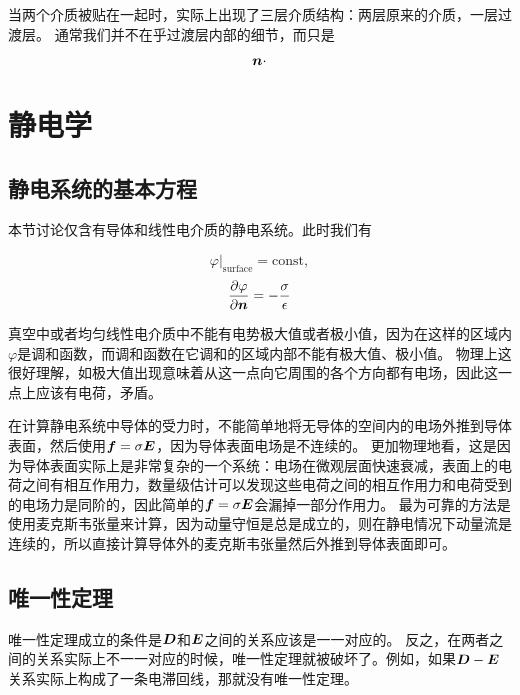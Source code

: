 \documentclass[UTF8, a4paper]{ctexart}
\newcommand*{\const}{\mathrm{const}}
\begin{document}
当两个介质被贴在一起时，实际上出现了三层介质结构：两层原来的介质，一层过渡层。
通常我们并不在乎过渡层内部的细节，而只是

\begin{equation}
    \vb*{n} \cdot 
\end{equation}

\section{静电学}

\subsection{静电系统的基本方程}

本节讨论仅含有导体和线性电介质的静电系统。此时我们有

\begin{equation}
    \varphi|_\text{surface} = \const,
\end{equation}
\begin{equation}
    \pdv{\varphi}{\vb*{n}} = - \frac{\sigma}{\epsilon}
\end{equation}

真空中或者均匀线性电介质中不能有电势极大值或者极小值，因为在这样的区域内$\varphi$是调和函数，而调和函数在它调和的区域内部不能有极大值、极小值。
物理上这很好理解，如极大值出现意味着从这一点向它周围的各个方向都有电场，因此这一点上应该有电荷，矛盾。

在计算静电系统中导体的受力时，不能简单地将无导体的空间内的电场外推到导体表面，然后使用$\vb*{f}=\sigma\vb*{E}$，因为导体表面电场是不连续的。
更加物理地看，这是因为导体表面实际上是非常复杂的一个系统：电场在微观层面快速衰减，表面上的电荷之间有相互作用力，数量级估计可以发现这些电荷之间的相互作用力和电荷受到的电场力是同阶的，因此简单的$\vb*{f}=\sigma\vb*{E}$会漏掉一部分作用力。
最为可靠的方法是使用麦克斯韦张量来计算，因为动量守恒是总是成立的，则在静电情况下动量流是连续的，所以直接计算导体外的麦克斯韦张量然后外推到导体表面即可。

\subsection{唯一性定理}

唯一性定理成立的条件是$\vb*{D}$和$\vb*{E}$之间的关系应该是一一对应的。
反之，在两者之间的关系实际上不一一对应的时候，唯一性定理就被破坏了。例如，如果$\vb*{D}-\vb*{E}$关系实际上构成了一条电滞回线，那就没有唯一性定理。

\end{document}
